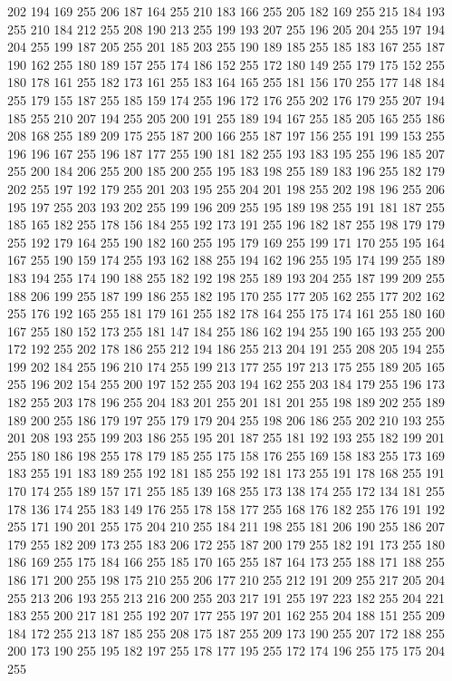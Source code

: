202 194 169 255 206 187 164 255 210 183 166 255 205 182 169 255 215 184 193 255 210 184 212 255 208 190 213 255 199 193 207 255 196 205 204 255 197 194 204 255 199 187 205 255 201 185 203 255 190 189 185 255 185 183 167 255 187 190 162 255 180 189 157 255
174 186 152 255 172 180 149 255 179 175 152 255 180 178 161 255 182 173 161 255 183 164 165 255 181 156 170 255 177 148 184 255 179 155 187 255 185 159 174 255 196 172 176 255 202 176 179 255 207 194 185 255 210 207 194 255 205 200 191 255 189 194 167 255
185 205 165 255 186 208 168 255 189 209 175 255 187 200 166 255 187 197 156 255 191 199 153 255 196 196 167 255 196 187 177 255 190 181 182 255 193 183 195 255 196 185 207 255 200 184 206 255 200 185 200 255 195 183 198 255 189 183 196 255 182 179 202 255
197 192 179 255 201 203 195 255 204 201 198 255 202 198 196 255 206 195 197 255 203 193 202 255 199 196 209 255 195 189 198 255 191 181 187 255 185 165 182 255 178 156 184 255 192 173 191 255 196 182 187 255 198 179 179 255 192 179 164 255 190 182 160 255
195 179 169 255 199 171 170 255 195 164 167 255 190 159 174 255 193 162 188 255 194 162 196 255 195 174 199 255 189 183 194 255 174 190 188 255 182 192 198 255 189 193 204 255 187 199 209 255 188 206 199 255 187 199 186 255 182 195 170 255 177 205 162 255
177 202 162 255 176 192 165 255 181 179 161 255 182 178 164 255 175 174 161 255 180 160 167 255 180 152 173 255 181 147 184 255 186 162 194 255 190 165 193 255 200 172 192 255 202 178 186 255 212 194 186 255 213 204 191 255 208 205 194 255 199 202 184 255
196 210 174 255 199 213 177 255 197 213 175 255 189 205 165 255 196 202 154 255 200 197 152 255 203 194 162 255 203 184 179 255 196 173 182 255 203 178 196 255 204 183 201 255 201 181 201 255 198 189 202 255 189 189 200 255 186 179 197 255 179 179 204 255
198 206 186 255 202 210 193 255 201 208 193 255 199 203 186 255 195 201 187 255 181 192 193 255 182 199 201 255 180 186 198 255 178 179 185 255 175 158 176 255 169 158 183 255 173 169 183 255 191 183 189 255 192 181 185 255 192 181 173 255 191 178 168 255
191 170 174 255 189 157 171 255 185 139 168 255 173 138 174 255 172 134 181 255 178 136 174 255 183 149 176 255 178 158 177 255 168 176 182 255 176 191 192 255 171 190 201 255 175 204 210 255 184 211 198 255 181 206 190 255 186 207 179 255 182 209 173 255
183 206 172 255 187 200 179 255 182 191 173 255 180 186 169 255 175 184 166 255 185 170 165 255 187 164 173 255 188 171 188 255 186 171 200 255 198 175 210 255 206 177 210 255 212 191 209 255 217 205 204 255 213 206 193 255 213 216 200 255 203 217 191 255
197 223 182 255 204 221 183 255 200 217 181 255 192 207 177 255 197 201 162 255 204 188 151 255 209 184 172 255 213 187 185 255 208 175 187 255 209 173 190 255 207 172 188 255 200 173 190 255 195 182 197 255 178 177 195 255 172 174 196 255 175 175 204 255
